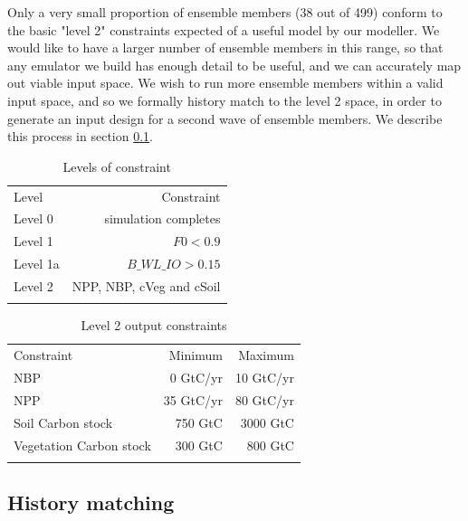 \documentclass[gmd, manuscript]{copernicus}
\begin{document}
Only a very small proportion of ensemble members (38 out of 499) conform to the basic "level 2" constraints expected of a useful model by our modeller. We would like to have a larger number of ensemble members in this range, so that any emulator we build has enough detail to be useful, and we can accurately map out viable input space. We wish to run more ensemble members within a valid input space, and so we formally history match to the level 2 space, in order to generate an input design for a second wave of ensemble members. We describe this process in section \ref{ssec:history_matching}.

\begin{table}[t]
\caption{Levels of constraint}
\label{table:levels_of_constraint}
\begin{tabular}{l r}
\tophline
Level & Constraint  \\ 
\middlehline
Level 0  & simulation completes \\
Level 1 & $F0 < 0.9$ \\
Level 1a & $B\_WL\_IO > 0.15 $ \\ 
Level 2  & NPP, NBP, cVeg and cSoil \\

\bottomhline
\end{tabular}
\belowtable{} %

\end{table}


\begin{table}[t]
\caption{Level 2 output constraints}
\label{table:level_2_constraints}
\begin{tabular}{l r r}
\tophline
Constraint & Minimum & Maximum \\ 
\middlehline
NBP & 0 GtC/yr &  10 GtC/yr\\
NPP & 35 GtC/yr & 80 GtC/yr \\
Soil Carbon stock & 750 GtC &  3000 GtC\\ 
Vegetation Carbon stock & 300 GtC & 800 GtC \\

\bottomhline
\end{tabular}
\belowtable{} %

\end{table}


\subsection{History matching}\label{ssec:history_matching}
\end{document}
